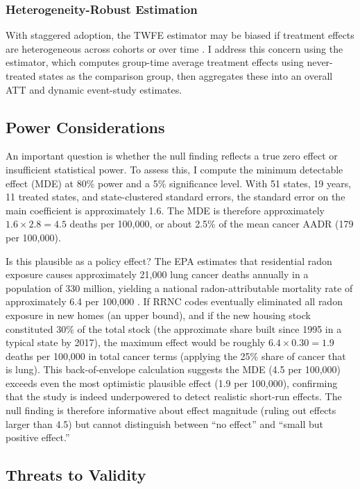 \documentclass[12pt]{article}
\begin{document}
\subsubsection*{Heterogeneity-Robust Estimation} With staggered adoption, the TWFE estimator may be biased if treatment effects are heterogeneous across cohorts or over time \citep{goodman2021difference, dechaisemartin2020two}. I address this concern using the \citet{callaway2021difference} estimator, which computes group-time average treatment effects using never-treated states as the comparison group, then aggregates these into an overall ATT and dynamic event-study estimates.

\subsection{Power Considerations}

An important question is whether the null finding reflects a true zero effect or insufficient statistical power. To assess this, I compute the minimum detectable effect (MDE) at 80\% power and a 5\% significance level. With 51 states, 19 years, 11 treated states, and state-clustered standard errors, the standard error on the main coefficient is approximately 1.6. The MDE is therefore approximately $1.6 \times 2.8 = 4.5$ deaths per 100,000, or about 2.5\% of the mean cancer AADR (179 per 100,000).

Is this plausible as a policy effect? The EPA estimates that residential radon exposure causes approximately 21,000 lung cancer deaths annually in a population of 330 million, yielding a national radon-attributable mortality rate of approximately 6.4 per 100,000 \citep{epa2003assessment}. If RRNC codes eventually eliminated all radon exposure in new homes (an upper bound), and if the new housing stock constituted 30\% of the total stock (the approximate share built since 1995 in a typical state by 2017), the maximum effect would be roughly $6.4 \times 0.30 = 1.9$ deaths per 100,000 in total cancer terms (applying the 25\% share of cancer that is lung). This back-of-envelope calculation suggests the MDE (4.5 per 100,000) exceeds even the most optimistic plausible effect (1.9 per 100,000), confirming that the study is indeed underpowered to detect realistic short-run effects. The null finding is therefore informative about effect magnitude (ruling out effects larger than 4.5) but cannot distinguish between ``no effect'' and ``small but positive effect.''

\subsection{Threats to Validity}
\end{document}
